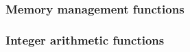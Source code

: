 \def\Subsubsection#1{\subsubsection{#1}}

\Subsubsection{Memory  management functions}

\Subsubsection{Integer arithmetic functions}
